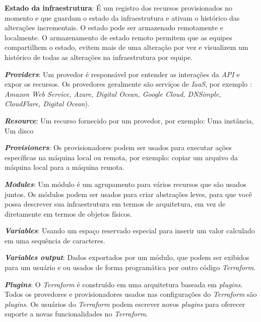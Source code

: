 \textbf{Estado da infraestrutura}: É um registro dos recursos provisionados no momento e que guardam o estado da infraestrutura e ativam o histórico das alterações incrementais. O estado pode ser armazenado remotamente e localmente. O armazenamento de estado remoto permitem que as equipes compartilhem o estado, evitem mais de uma alteração por vez e visualizem um histórico de todas as alterações na infraestrutura por equipe.

\textbf{\textit{Providers}}: Um provedor é responsável por entender as interações da \textit{API} e expor os recursos. Os provedores geralmente são serviços de \textit{IaaS},  por exemplo : \textit{Amazon
Web Service, Azure, Digital Ocean, Google Cloud, DNSimple, CloudFlare, Digital Ocean}).

\textbf{\textit{Resource}}: Um recurso fornecido por um provedor, por exemplo: Uma instância, Um disco   

\textbf{\textit{Provisioners}}: Os provisionadores podem ser usados para executar ações específicas na máquina local ou remota, por exemplo: copiar um arquivo da máquina local para a máquina remota.

\textbf{\textit{Modules}}: Um módulo é um agrupamento para vários recursos que são usados juntos. Os módulos podem ser usados para criar abstrações leves, para que você possa descrever sua infraestrutura em termos de arquitetura, em vez de diretamente em termos de objetos físicos.

\textbf{\textit{Variables}}: Usando um espaço reservado especial para inserir um valor calculado em uma sequência de caracteres. 

 \textbf{\textit{Variables output}}: Dados exportados por um módulo, que podem ser exibidos para um usuário e  ou usados de forma programática por outro código \textit{Terraform}.
 
 \textbf{\textit{Plugins}}: O \textit{Terraform} é construído em uma arquitetura baseada em \textit{plugins}. Todos os provedores e provisionadores usados nas configurações do \textit{Terraform} são \textit{plugins}. Os usuários do \textit{Terraform} podem escrever novos \textit{plugins} para oferecer suporte a novas funcionalidades no \textit{Terraform}.
 
